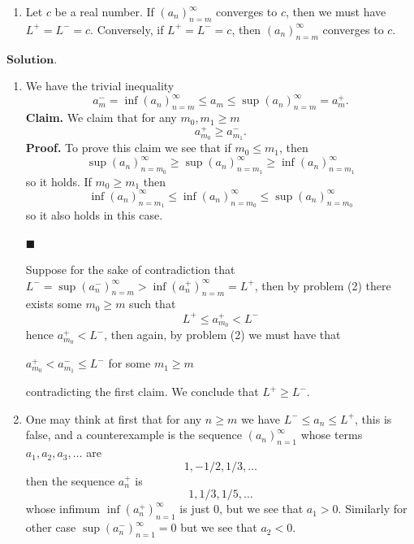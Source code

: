 \documentclass{article}
\theoremstyle{remark}
\newenvironment{claim}{\textbf{Claim.}}{}
\begin{document}
\begin{enumerate}
\begin{enumerate}
            \item[(f)] Let \( c \) be a real number. If \( (a_n)_{n=m}^{\infty} \)
            converges to \( c \), then we must have \( L^+ = L^- = c \). Conversely,
            if \( L^+ = L^- = c \), then \( (a_n)_{n=m}^{\infty} \) converges to \( c \).
        \end{enumerate}
        $\textbf{Solution.}$
        \begin{enumerate}
            \item[(c)] We have the trivial inequality 
            \[
            a_{m}^- = \inf(a_n)_{n=m}^{\infty} \leq a_m \leq \sup(a_n)_{n=m}^{\infty} = a_m^{+}.
            \] 
            \begin{claim}
                We claim that for any $m_0, m_1 \geq m$
                \[
                a_{m_0}^{+} \geq a_{m_1}^{-}.
                \]
            \end{claim}
            \textbf{Proof.}
            To prove this claim we see that if $m_0 \leq m_1$, then
            \[
            \sup(a_n)_{n=m_0}^{\infty} \geq \sup(a_n)_{n=m_1}^{\infty} \geq \inf(a_n)_{n=m_1}^{\infty}
            \]
            so it holds.
            If $m_0 \geq m_1$ then 
            \[
            \inf(a_n)_{n=m_1}^{\infty} \leq \inf(a_n)_{n=m_0}^{\infty} \leq \sup(a_n)_{n=m_0}^{\infty}
            \]
            so it also holds in this case.
            \begin{flushright}
                $\blacksquare$
            \end{flushright}

            Suppose for the sake of contradiction that $L^{-} = \sup(a_{n}^{-})_{n=m}^{\infty} > \inf(a_{n}^{+})_{n=m}^{\infty} = L^{+}$,
            then by problem (2) there exists some $m_0 \geq m$ such that
            \[
            L^{+} \leq a_{m_0}^{+} < L^{-}
            \]
            hence $a_{m_0}^{+} < L^{-}$, then again, by problem (2) we must have that 
            \begin{center}
            $a_{m_0}^{+} < a_{m_1}^{-} \leq L^-$ for some $m_1 \geq m$
            \end{center}
            contradicting the first claim. We conclude that $L^{+} \geq L^{-}$.

            \item[(d)] One may think at first that for any $n \geq m$ we have $L^- \leq a_n \leq L^+$,
            this is false, and a counterexample is the sequence $(a_n)_{n=1}^{\infty}$ 
            whose terms $a_1, a_2, a_3, \dots $ are
            \[
            1, -1/2, 1/3, \dots
            \]
            then the sequence $a_n^+$ is 
            \[
            1, 1/3, 1/5, \dots
            \]
            whose infimum $\inf(a_n^+)_{n=1}^{\infty}$ is just 0, but we see that $a_1 > 0$.
            Similarly for other case $\sup(a_n^-)_{n=1}^{\infty} = 0$ but we see that $a_2 < 0$.


\end{enumerate}
\end{enumerate}
\end{document}
